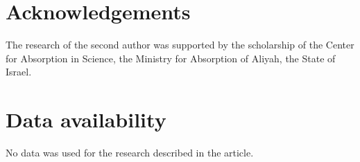 \documentclass{elsarticle}
\theoremstyle{plain}
\theoremstyle{definition}
\numberwithin{equation}{section}
\begin{document}
\section*{Acknowledgements}

The research of the second author was supported by the scholarship of the Center for Absorption in Science, the Ministry for Absorption of Aliyah, the State of Israel.

\section*{Data availability}

No data was used for the research described in the article.



\end{document}
